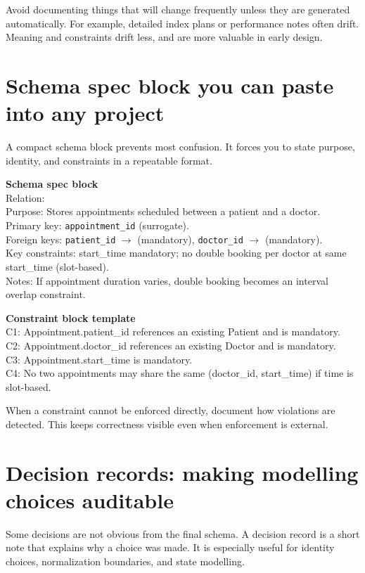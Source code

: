 \begin{notebox}
Avoid documenting things that will change frequently unless they are generated automatically.
For example, detailed index plans or performance notes often drift.
Meaning and constraints drift less, and are more valuable in early design.
\end{notebox}

\section{Schema spec block you can paste into any project}
A compact schema block prevents most confusion.
It forces you to state purpose, identity, and constraints in a repeatable format.

\begin{examplebox}
\textbf{Schema spec block}\\[4pt]
Relation: \\
Purpose: Stores appointments scheduled between a patient and a doctor.\\
Primary key: \texttt{appointment\_id} (surrogate).\\
Foreign keys: \texttt{patient\_id} \(\rightarrow\)  (mandatory), \texttt{doctor\_id} \(\rightarrow\)  (mandatory).\\
Key constraints: start\_time mandatory; no double booking per doctor at same start\_time (slot-based).\\
Notes: If appointment duration varies, double booking becomes an interval overlap constraint.
\end{examplebox}

\begin{examplebox}
\textbf{Constraint block template}\\[4pt]
C1: Appointment.patient\_id references an existing Patient and is mandatory.\\
C2: Appointment.doctor\_id references an existing Doctor and is mandatory.\\
C3: Appointment.start\_time is mandatory.\\
C4: No two appointments may share the same (doctor\_id, start\_time) if time is slot-based.
\end{examplebox}

When a constraint cannot be enforced directly, document how violations are detected.
This keeps correctness visible even when enforcement is external.

\section{Decision records: making modelling choices auditable}
Some decisions are not obvious from the final schema.
A decision record is a short note that explains why a choice was made.
It is especially useful for identity choices, normalization boundaries, and state modelling.

